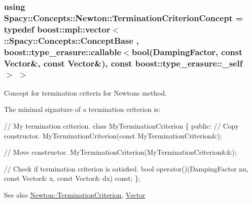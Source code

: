 \subsubsection[{Termination\+Criterion\+Concept}]{\setlength{\rightskip}{0pt plus 5cm}using {\bf Spacy\+::\+Concepts\+::\+Newton\+::\+Termination\+Criterion\+Concept} = typedef boost\+::mpl\+::vector$<$ \+::{\bf Spacy\+::\+Concepts\+::\+Concept\+Base} , boost\+::type\+\_\+erasure\+::callable$<$bool(Damping\+Factor, const Vector\&, const Vector\&), const boost\+::type\+\_\+erasure\+::\+\_\+self$>$ $>$}\label{group__NewtonConceptGroup_ga7d7604bea8b7c261d3179a7e95ffbe76_ga7d7604bea8b7c261d3179a7e95ffbe76}


Concept for termination criteria for Newton\textquotesingle{}s method. 

\label{group__NewtonConceptGroup_ga7d7604bea8b7c261d3179a7e95ffbe76_Newton_TerminationCriterionConceptAnchor}%
\hypertarget{group__NewtonConceptGroup_ga7d7604bea8b7c261d3179a7e95ffbe76_Newton_TerminationCriterionConceptAnchor}{}%
The minimal signature of a termination criterion is\+: 
\begin{DoxyCode}
\textcolor{comment}{// My termination criterion.}
\textcolor{keyword}{class }MyTerminationCriterion
\{
\textcolor{keyword}{public}:
  \textcolor{comment}{// Copy constructor.}
  MyTerminationCriterion(\textcolor{keyword}{const} MyTerminationCriterion&);

  \textcolor{comment}{// Move constructor.}
  MyTerminationCriterion(MyTerminationCriterion&&);

  \textcolor{comment}{// Check if termination criterion is satisfied.}
  \textcolor{keywordtype}{bool} operator()(DampingFactor nu, \textcolor{keyword}{const} Vector& x, \textcolor{keyword}{const} Vector& dx) \textcolor{keyword}{const};
\};
\end{DoxyCode}


\begin{DoxySeeAlso}{See also}
\hyperlink{namespaceSpacy_1_1Newton_abfa64b52531032d7a5fe6d0ec1a3cbd5_Newton_TerminationCriterionAnchor}{Newton\+:\+:Termination\+Criterion}, \hyperlink{group__SpacyGroup_gafc144d2730ef87a67e54f8cd750b1f54_VectorAnchor}{Vector} 
\end{DoxySeeAlso}
